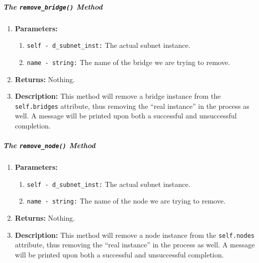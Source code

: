         \subparagraph{The \texttt{remove\_bridge()} Method}
            \begin{enumerate}
                \item \textbf{Parameters:}
                \begin{enumerate}
                    \item \texttt{self - d\_subnet\_inst:} The actual subnet instance.
                    \item \texttt{name - string:} The name of the bridge we are trying to remove.
                \end{enumerate}
                \item \textbf{Returns:} Nothing.
                \item \textbf{Description:} This method will remove a bridge instance from the \texttt{self.bridges} attribute, thus removing the ``real instance'' in the process as well. A message will be printed upon both a successful and unsuccessful completion.
            \end{enumerate}

        \subparagraph{The \texttt{remove\_node()} Method}
            \begin{enumerate}
                \item \textbf{Parameters:}
                \begin{enumerate}
                    \item \texttt{self - d\_subnet\_inst:} The actual subnet instance.
                    \item \texttt{name - string:} The name of the node we are trying to remove.
                \end{enumerate}
                \item \textbf{Returns:} Nothing.
                \item \textbf{Description:} This method will remove a node instance from the \texttt{self.nodes} attribute, thus removing the ``real instance'' in the process as well. A message will be printed upon both a successful and unsuccessful completion.
            \end{enumerate}

